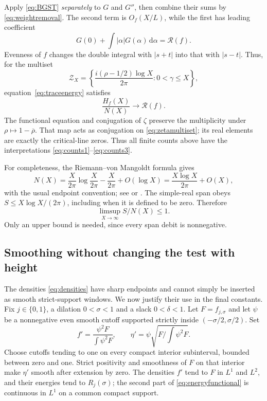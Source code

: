 \documentclass[11pt]{amsart}
\numberwithin{equation}{section}
\newcommand{\dd}{\,\mathrm d}
\begin{document}
Apply \eqref{eq:BGST} \emph{separately} to $G$ and $G''$, then
combine their sums by \eqref{eq:weightremoval}. The second term is
$O_f(X/L)$, while the first has leading coefficient
\[
 G(0)+\int|\alpha|G(\alpha)\dd\alpha=\mathcal R(f).
\]
Evenness of $f$ changes the double integral with $|s+t|$ into that
with $|s-t|$. Thus, for the multiset
\begin{equation}
 \mathcal Z_X=\left\{\frac{i(\rho-1/2)\log X}{2\pi}:
                             0<\gamma\le X\right\},
 \label{eq:zetamultiset}
\end{equation}
equation~\eqref{eq:traceenergy} satisfies
\begin{equation}
 \frac{H_f(X)}{N(X)}\longrightarrow\mathcal R(f).
 \label{eq:energylimit}
\end{equation}
The functional equation and conjugation of $\zeta$ preserve the
multiplicity under $\rho\mapsto1-\overline\rho$. That map acts
as conjugation on \eqref{eq:zetamultiset}; its real elements are
exactly the critical-line zeros. Thus all finite counts above have
the interpretations \eqref{eq:counts1}--\eqref{eq:counts3}.

For completeness, the Riemann--von Mangoldt formula gives
\begin{equation}
 N(X)=\frac X{2\pi}\log\frac X{2\pi}-\frac X{2\pi}+O(\log X)
     =\frac{X\log X}{2\pi}+O(X),\label{eq:RVM}
\end{equation}
with the usual endpoint convention; see \cite{Titchmarsh} or
\cite[Lemma 2]{BGST}. The simple-real span obeys
$S\le X\log X/(2\pi)$, including when it is defined to be zero.
Therefore
\begin{equation}
 \limsup_{X\to\infty}S/N(X)\le1.\label{eq:spanlimit}
\end{equation}
Only an upper bound is needed, since every span debit is nonnegative.

\subsection{Smoothing without changing the test with height}
\label{sec:smoothing}

The densities \eqref{eq:densities} have sharp endpoints and cannot
simply be inserted as smooth strict-support windows. We now justify
their use in the final constants. Fix $j\in\{0,1\}$, a dilation
$0<\sigma<1$ and a slack $0<\delta<1$. Let
$F=f_{j,\sigma}$ and let $\psi$ be a nonnegative even smooth cutoff
supported strictly inside $(-\sigma/2,\sigma/2)$. Set
\begin{equation}
 f'=\frac{\psi^2F}{\int\psi^2F},\qquad
 \eta'=\psi\sqrt{F/\int\psi^2F}.\label{eq:smoothing}
\end{equation}
Choose cutoffs tending to one on every compact interior subinterval,
bounded between zero and one. Strict positivity and smoothness of $F$
on that interior make $\eta'$ smooth after extension by zero. The
densities $f'$ tend to $F$ in $L^1$ and $L^2$, and their energies
tend to $R_j(\sigma)$; the second part of
\eqref{eq:energyfunctional} is continuous in $L^1$ on a common
compact support.
\end{document}
